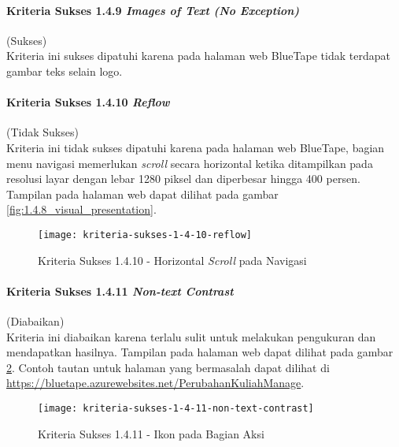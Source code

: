 \paragraph{Kriteria Sukses 1.4.9 \textit{Images of Text (No Exception)}}
\label{par:kepatuhan_bluetape_kriteria_sukses_1.4.9}
(Sukses)\\

Kriteria ini sukses dipatuhi karena pada halaman web BlueTape tidak terdapat gambar teks selain logo.

\paragraph{Kriteria Sukses 1.4.10 \textit{Reflow}}
\label{par:kepatuhan_bluetape_kriteria_sukses_1.4.10}
(Tidak Sukses)\\

Kriteria ini tidak sukses dipatuhi karena pada halaman web BlueTape, bagian menu navigasi memerlukan \textit{scroll} secara horizontal ketika ditampilkan pada resolusi layar dengan lebar 1280 piksel dan diperbesar hingga 400 persen. Tampilan pada halaman web dapat dilihat pada gambar \ref{fig:1.4.8_visual_presentation}.

\begin{figure}[H]
    \centering  
    \texttt{[image: kriteria-sukses-1-4-10-reflow]}  
    \caption[Kriteria Sukses 1.4.10 - Horizontal \textit{Scroll} pada Navigasi]{Kriteria Sukses 1.4.10 - Horizontal \textit{Scroll} pada Navigasi}
    \label{fig:1.4.10_reflow}  
\end{figure} 

\paragraph{Kriteria Sukses 1.4.11 \textit{Non-text Contrast}}
\label{par:kepatuhan_bluetape_kriteria_sukses_1.4.11}
(Diabaikan)\\

Kriteria ini diabaikan karena terlalu sulit untuk melakukan pengukuran dan mendapatkan hasilnya. Tampilan pada halaman web dapat dilihat pada gambar \ref{fig:1.4.11_non_text_contrast}. Contoh tautan untuk halaman yang bermasalah dapat dilihat di \url{https://bluetape.azurewebsites.net/PerubahanKuliahManage}.

\begin{figure}[H]
    \centering  
    \texttt{[image: kriteria-sukses-1-4-11-non-text-contrast]}  
    \caption[Kriteria Sukses 1.4.11 - Ikon pada Bagian Aksi]{Kriteria Sukses 1.4.11 - Ikon pada Bagian Aksi}
    \label{fig:1.4.11_non_text_contrast}  
\end{figure} 

